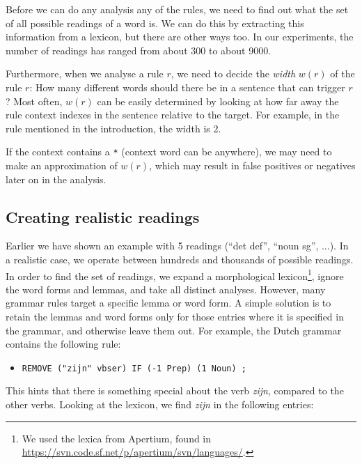 Before we can do any analysis any of the rules, we need to find out what the set of all possible readings of a word is. We can do this by extracting this information from a lexicon, but there are other ways too. In our experiments, the number of readings has ranged from about 300 to about 9000. 

Furthermore, when we analyse a rule $r$, we need to decide the {\em width} $w(r)$ of the rule $r$: How many different words should there be in a sentence that can trigger $r$? Most often, $w(r)$ can be easily determined by looking at how far away the rule context indexes in the sentence relative to the target. For example, in the rule mentioned in the introduction, the width is 2.

If the context contains a \verb!*! (context word can be anywhere),
we may need to make an approximation of $w(r)$, which may result in false positives or negatives later on in the analysis.



\subsection{Creating realistic readings}
\label{sec:realistic_readings}

Earlier we have shown an example with 5 readings (``det def'', ``noun sg'', ...). In a realistic case, we operate between hundreds and thousands of possible readings. 
In order to find the set of readings, we expand a morphological lexicon\footnote{We used the lexica from Apertium, found in \url{https://svn.code.sf.net/p/apertium/svn/languages/}.}, ignore the word forms and lemmas, and take all distinct analyses. 
However, many grammar rules target a specific lemma or word form.
A simple solution is to retain the lemmas and word forms only for those entries where it is specified in the grammar, and otherwise leave them out. For example, the Dutch grammar contains the following rule:

\begin{itemize}
 \item[] \texttt{REMOVE ("zijn" vbser) IF (-1 Prep) (1 Noun) ;}
\end{itemize}

This hints that there is something special about the verb \emph{zijn}, compared to the other verbs. Looking at the lexicon, we find \emph{zijn} in the following entries:

